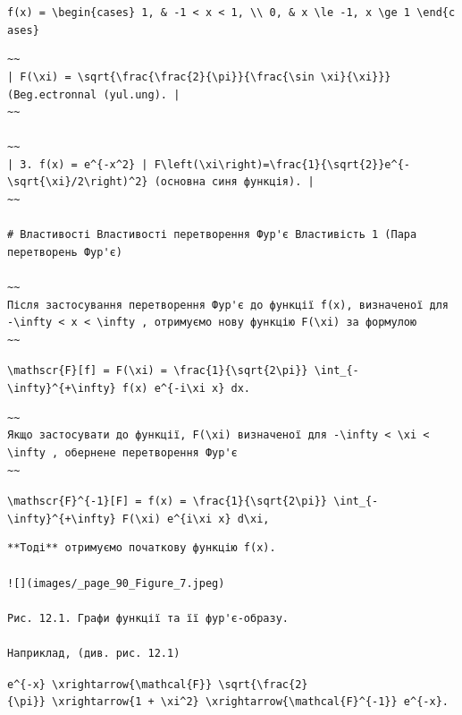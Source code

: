 \documentclass[
  ukrainian,
]{article}
\begin{document}
\texttt{f(x)\ =\ \textbackslash{}begin\{cases\}\ 1,\ \&\ -1\ \textless{}\ x\ \textless{}\ 1,\ \textbackslash{}\textbackslash{}\ 0,\ \&\ x\ \textbackslash{}le\ -1,\ x\ \textbackslash{}ge\ 1\ \textbackslash{}end\{cases\}}

\begin{verbatim}
~~
| F(\xi) = \sqrt{\frac{\frac{2}{\pi}}{\frac{\sin \xi}{\xi}}} (Beg.ectronnal (yul.ung). |
~~

~~
| 3. f(x) = e^{-x^2} | F\left(\xi\right)=\frac{1}{\sqrt{2}}e^{-\sqrt{\xi}/2\right)^2} (основна синя функція). |
~~

# Властивості Властивості перетворення Фур'є Властивість 1 (Пара перетворень Фур'є)

~~
Після застосування перетворення Фур'є до функції f(x), визначеної для -\infty < x < \infty , отримуємо нову функцію F(\xi) за формулою
~~
\end{verbatim}

\texttt{\textbackslash{}mathscr\{F\}{[}f{]}\ =\ F(\textbackslash{}xi)\ =\ \textbackslash{}frac\{1\}\{\textbackslash{}sqrt\{2\textbackslash{}pi\}\}\ \textbackslash{}int\_\{-\textbackslash{}infty\}\^{}\{+\textbackslash{}infty\}\ f(x)\ e\^{}\{-i\textbackslash{}xi\ x\}\ dx.}

\begin{verbatim}
~~
Якщо застосувати до функції, F(\xi) визначеної для -\infty < \xi < \infty , обернене перетворення Фур'є
~~
\end{verbatim}

\texttt{\textbackslash{}mathscr\{F\}\^{}\{-1\}{[}F{]}\ =\ f(x)\ =\ \textbackslash{}frac\{1\}\{\textbackslash{}sqrt\{2\textbackslash{}pi\}\}\ \textbackslash{}int\_\{-\textbackslash{}infty\}\^{}\{+\textbackslash{}infty\}\ F(\textbackslash{}xi)\ e\^{}\{i\textbackslash{}xi\ x\}\ d\textbackslash{}xi,}

\begin{verbatim}
**Тоді** отримуємо початкову функцію f(x).

![](images/_page_90_Figure_7.jpeg)

Рис. 12.1. Графи функції та її фур'є-образу.

Наприклад, (див. рис. 12.1)
\end{verbatim}

\texttt{e\^{}\{-\textbar{}x\textbar{}\}\ \textbackslash{}xrightarrow\{\textbackslash{}mathcal\{F\}\}\ \textbackslash{}sqrt\{\textbackslash{}frac\{2\}\{\textbackslash{}pi\}\}\ \textbackslash{}xrightarrow\{1\ +\ \textbackslash{}xi\^{}2\}\ \textbackslash{}xrightarrow\{\textbackslash{}mathcal\{F\}\^{}\{-1\}\}\ e\^{}\{-\textbar{}x\textbar{}\}.}
\end{document}
